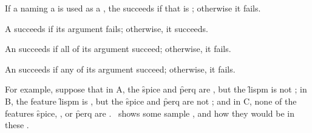 If a  naming a  is used as a ,
the  succeeds if that  is ;
otherwise it fails.


A   succeeds 
if its argument  fails;
otherwise, it succeeds.


An   succeeds 
if all of its argument  succeed;
otherwise, it fails.


An   succeeds 
if any of its argument  succeed;
otherwise, it fails.

\endlist

For example, suppose that
 in  A, the  \f{spice} and \f{perq} are ,
			     but the  \f{lispm} is not ;
 in  B, the feature \f{lispm} is ,
			     but the  \f{spice} and \f{perq} are
			      not ;
 and 
 in  C, none of the features \f{spice}, , or \f{perq} are
			     .
\Thenextfigure\ shows some sample , and how they would be 
 in these .

